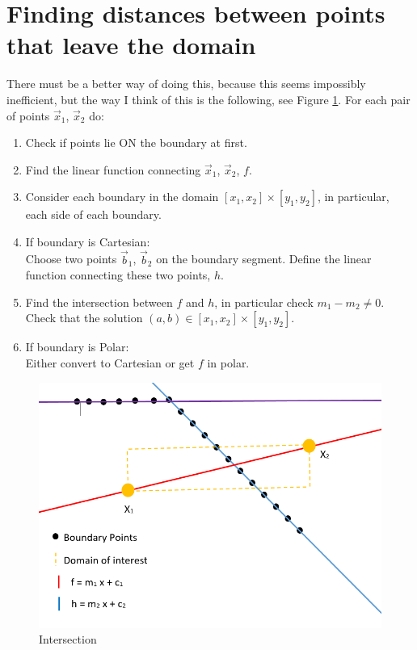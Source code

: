 \documentclass[11pt, a4paper]{article}
\theoremstyle{definition}
\begin{document}
	
	\section{Finding distances between points that leave the domain}
	There must be a better way of doing this, because this seems impossibly inefficient, but the way I think of this is the following, see Figure \ref{FI}.
	For each pair of points $\vec x_1$, $\vec x_2$ do:
	\begin{enumerate}
		\item Check if points lie ON the boundary at first. 
		\item Find the linear function connecting $\vec x_1$, $\vec x_2$, $f$.
		\item Consider each boundary in the domain $[x_1, x_2]\times [y_1, y_2]$, in particular, each side of each boundary.
		\item If boundary is Cartesian:\\
		Choose two points $\vec b_1$, $\vec b_2$ on the boundary segment. Define the linear function connecting these two points, $h$. 
		\item Find the intersection between $f$ and $h$, in particular check $m_1 - m_2 \neq 0 $. Check that the solution $(a,b) \in  [x_1, x_2]\times [y_1, y_2]$.
		\item If boundary is Polar:\\
		Either convert to Cartesian or get $f$ in polar.
	\end{enumerate}
		\begin{figure}[h]
		\centering
		\includegraphics[scale=0.7]{Intersection.png}
		\caption{Intersection} 
		\label{FI}
    	\end{figure}
    
\end{document}

